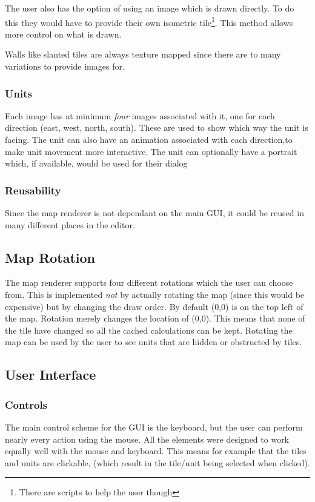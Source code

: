 The user also has the option of using an image which is drawn directly. To do this they would have to provide their own isometric tile\footnote{There are scripts to help the user though}. This method allows more control on what is drawn.  

Walls like slanted tiles are always texture mapped since there are to many variations to provide images for. 

\subsubsection{Units}
Each image has at minimum \emph{four} images associated with it, one for each direction (east, west, north, south). These are used to show which way the unit is facing. The unit can also have an animation associated with each direction,to make unit movement more interactive.  The unit can optionally have a portrait which, if available, would be used for their dialog

\subsubsection{Reusability}
Since the map renderer is not dependant on the main GUI, it could be reused in many different places in the editor. 

\subsection{Map Rotation}
The map renderer supports four different rotations which the user can choose from. This is implemented \emph{not} by actually rotating the map (since this would be expensive) but by changing the draw order. By default (0,0) is on the top left of the map. Rotation merely changes the location of (0,0). This means that none of the tile have changed so all the cached calculations can be kept.  Rotating the map can be used by the user to see units that are hidden or obstructed by tiles. 

\subsection{User Interface}
\subsubsection{Controls}
The main control scheme for the GUI is the keyboard, but the user can perform nearly every action using the mouse. All the elements were designed to work equally well with the mouse and keyboard. This means for example that the tiles and units are clickable, (which result in the tile/unit being selected when clicked).  


